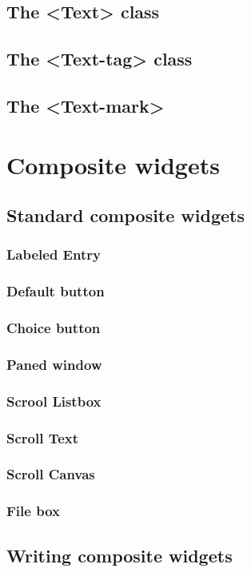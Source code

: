 \documentclass[10pt]{report}
\begin{document}
\section{The <Text> class}
\section{The <Text-tag> class}
\section{The <Text-mark>}


\chapter{Composite widgets}
\section{Standard composite widgets}

\subsection{Labeled Entry}
\subsection{Default button}
\subsection{Choice button}
\subsection{Paned window}
\subsection{Scrool Listbox}
\subsection{Scroll Text}
\subsection{Scroll Canvas}
\subsection{File box}

\section{Writing composite widgets}


\end{document}

